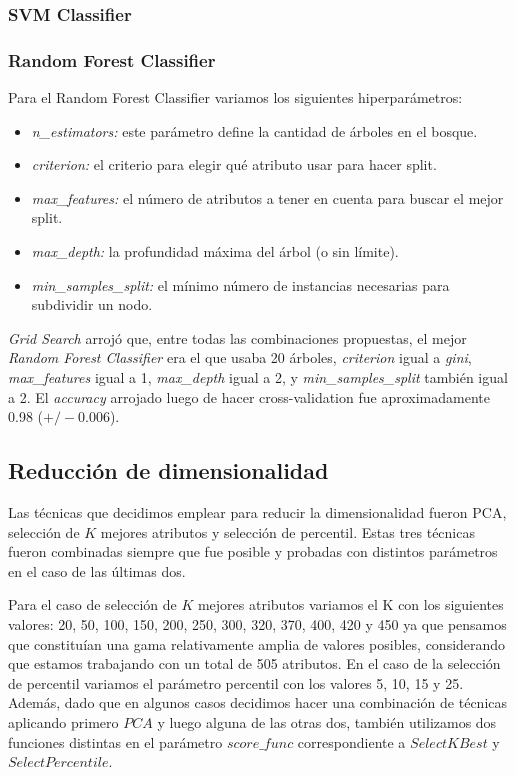 \documentclass[a4paper]{article}
\begin{document}
\subsubsection{SVM Classifier}

\subsubsection{Random Forest Classifier}
Para el Random Forest Classifier variamos los siguientes hiperparámetros:
\begin{itemize}
	\item \textit{n_estimators:} este parámetro define la cantidad de árboles en el bosque.
	\item \textit{criterion:} el criterio para elegir qué atributo usar para hacer split.
	\item \textit{max\_features:} el número de atributos a tener en cuenta para buscar el mejor split.
	\item \textit{max\_depth:} la profundidad máxima del árbol (o sin límite).
	\item \textit{min\_samples\_split:} el mínimo número de instancias necesarias para subdividir un nodo.
\end{itemize}

\textit{Grid Search} arrojó que, entre todas las combinaciones propuestas, el mejor \textit{Random Forest Classifier} era el que usaba 20 árboles, \textit{criterion} igual a \textit{gini}, \textit{max\_features} igual a 1, \textit{max\_depth} igual a 2, y \textit{min\_samples\_split} también igual a 2. \newline
\indent El \textit{accuracy} arrojado luego de hacer cross-validation fue aproximadamente 0.98 ($+/-$0.006).

\subsection{Reducción de dimensionalidad}
Las técnicas que decidimos emplear para reducir la dimensionalidad fueron PCA, selección de $K$ mejores atributos y selección de percentil. Estas tres técnicas fueron combinadas siempre que fue posible y probadas con distintos parámetros en el caso de las últimas dos.

Para el caso de selección de $K$ mejores atributos variamos el K con los siguientes valores: 20, 50, 100, 150, 200, 250, 300, 320, 370, 400, 420 y 450 ya que pensamos que constituían una gama relativamente amplia de valores posibles, considerando que estamos trabajando con un total de 505 atributos. En el caso de la selección de percentil variamos el parámetro percentil con los valores 5, 10, 15 y 25. Además, dado que en algunos casos decidimos hacer una combinación de técnicas aplicando primero $PCA$ y luego alguna de las otras dos, también utilizamos dos funciones distintas en el parámetro $score\_func$ correspondiente a $SelectKBest$ y $SelectPercentile$.
\end{document}
